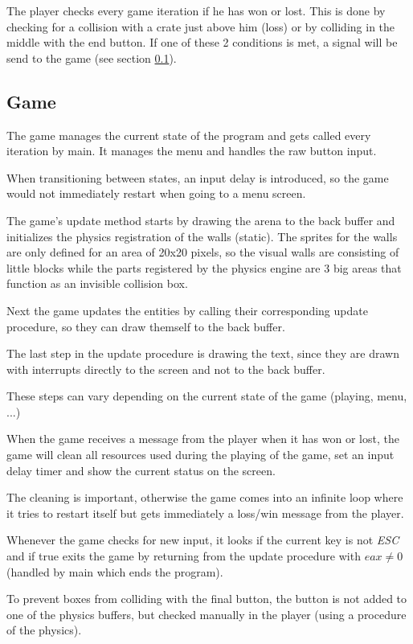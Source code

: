 \documentclass[]{article}
\begin{document}
The player checks every game iteration if he has won or lost. This is done by
checking for a collision with a crate just above him (loss) or by colliding in
the middle with the end button. If one of these 2 conditions is met, a signal
will be send to the game (see section \ref{sub:game}).

\subsection{Game}%
\label{sub:game}

The game manages the current state of the program and gets called every
iteration by main. It manages the menu and handles the raw button input.

When transitioning between states, an input delay is introduced, so the game 
would not immediately restart when going to a menu screen.

The game's update method starts by drawing the arena to the back buffer and 
initializes the physics registration of the walls (static). The sprites for the
walls are only defined for an area of 20x20 pixels, so the visual walls are consisting
of little blocks while the parts registered by the physics engine are 3 big
areas that function as an invisible collision box.

Next the game updates the entities by calling their corresponding update 
procedure, so they can draw themself to the back buffer.

The last step in the update procedure is drawing the text, since they are
drawn with interrupts directly to the screen and not to the back buffer.

These steps can vary depending on the current state of the game (playing, menu,
...)

When the game receives a message from the player when it has won or lost, the game
will clean all resources used during the playing of the game, set an input
delay timer and show the current status on the screen.

The cleaning is important, otherwise the game comes into an infinite loop where
it tries to restart itself but gets immediately a loss/win message from the
player.

Whenever the game checks for new input, it looks if the current key is not 
\emph{ESC} and if true exits the game by returning from the update procedure
with $eax \neq 0$ (handled by main which ends the program).

To prevent boxes from colliding with the final button, the button is not added
to one of the physics buffers, but checked manually in the player (using a
procedure of the physics).
\end{document}
